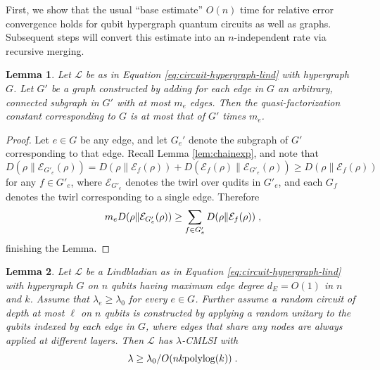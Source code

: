 \documentclass[11pt,reqno]{amsart}
\newtheorem{lemma}{Lemma}[section]
\newcommand{\E}{\mathcal{E}}
\newcommand{\pl}{\hspace{.1cm}}
\renewcommand{\L}{\mathcal{L}}
\begin{document}
First, we show that the usual ``base estimate'' $O(n)$ time for relative error convergence holds for qubit hypergraph quantum circuits as well as graphs. Subsequent steps will convert this estimate into an $n$-independent rate via recursive merging.
\begin{lemma} \label{lem:hypergraph-to-graph}
    Let $\L$ be as in Equation \eqref{eq:circuit-hypergraph-lind} with hypergraph $G$. Let $G'$ be a graph constructed by adding for each edge in $G$ an arbitrary, connected subgraph in $G'$ with at most $m_e$ edges. Then the quasi-factorization constant corresponding to $G$ is at most that of $G'$ times $m_e$.
\end{lemma}
\begin{proof}
    Let $e \in G$ be any edge, and let $G_e'$ denote the subgraph of $G'$ corresponding to that edge. Recall Lemma \ref{lem:chainexp}, and note that
    \begin{equation}
        D(\rho \| \E_{G'_e}(\rho)) = D(\rho \| \E_f(\rho)) + D(\E_f(\rho) \| \E_{G'_e}(\rho))
            \geq D(\rho \| \E_f(\rho))
    \end{equation}
    for any $f \in G'_e$, where $\E_{G'_e}$ denotes the twirl over qudits in $G'_e$, and each $G_f$ denotes the twirl corresponding to a single edge. Therefore
    \begin{equation}
        m_e D(\rho \| \E_{G'_e}(\rho)) \geq \sum_{f \in G_e'} D(\rho \| \E_f(\rho)) \pl,
    \end{equation}
    finishing the Lemma.
\end{proof}
\begin{lemma} \label{lem:hypergraph-base}
    Let $\L$ be a Lindbladian as in Equation \eqref{eq:circuit-hypergraph-lind} with hypergraph $G$ on $n$ qubits having maximum edge degree $d_E = O(1)$ in $n$ and $k$. Assume that $\lambda_e \geq \lambda_0$ for every $e \in G$. Further assume a random circuit of depth at most $\ell$ on $n$ qubits is constructed by applying a random unitary to the qubits indexed by each edge in $G$, where edges that share any nodes are always applied at different layers. Then $\L$ has $\lambda$-CMLSI with
    \begin{equation}
        \lambda \geq \lambda_0 /O(n k \mathrm{polylog}(k)) \pl.
    \end{equation}
\end{lemma}
\end{document}
